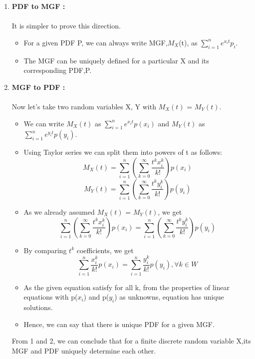 \documentclass[12pt]{article}
\begin{document}
\begin{enumerate}
    \item \textbf{PDF to MGF :}\\
\\
It is simpler to prove this direction. 
\begin{itemize}
    \item For a given PDF P, we can always write MGF,$M_X$(t), as $\sum_{i=1}^ne^{x_it}p_i$.
    \item The MGF can be uniquely defined for a particular X and its corresponding PDF,P.
\end{itemize}

    \item \textbf{MGF to PDF :}\\
\\
Now let's take two random variables X, Y with $M_X(t)$ = $M_Y(t)$.
\begin{itemize}
    \item We can write $M_X(t)$ as $\sum_{i=1}^ne^{x_it}p(x_i)$ and $M_Y(t)$ as $\sum_{i=1}^ne^{y_it}p(y_i)$.
    \item Using Taylor series we can split them into powers of t as follows:
\begin{equation}
    M_X(t) = \sum_{i=1}^n(\sum_{k=0}^\infty \frac{t^kx_i^k}{k!})p(x_i)
\end{equation}
\begin{equation}
    M_Y(t) = \sum_{i=1}^n(\sum_{k=0}^\infty \frac{t^ky_i^k}{k!})p(y_i)
\end{equation}
    \item As we already assumed $M_X(t)$ = $M_Y(t)$, we get 
\begin{equation}
    \sum_{i=1}^n(\sum_{k=0}^\infty \frac{t^kx_i^k}{k!})p(x_i) = \sum_{i=1}^n(\sum_{k=0}^\infty \frac{t^ky_i^k}{k!})p(y_i)
\end{equation}
    \item By comparing $t^k$ coefficients, we get
\begin{equation}
    \sum_{i=1}^n\frac{x_i^k}{k!}p(x_i) = \sum_{i=1}^n\frac{y_i^k}{k!}p(y_i) ,\forall k\in W
\end{equation}
    \item As the given equation satisfy for all k, from the properties of linear equations with p($x_i$) and p($y_i$) as unknowns, equation has unique solutions.
    \item  Hence, we can say that there is unique PDF for a given MGF.
\end{itemize}
From 1 and 2, we can conclude that for a finite discrete random variable X,its MGF and PDF uniquely determine each other.\\

\end{enumerate}
\end{document}
